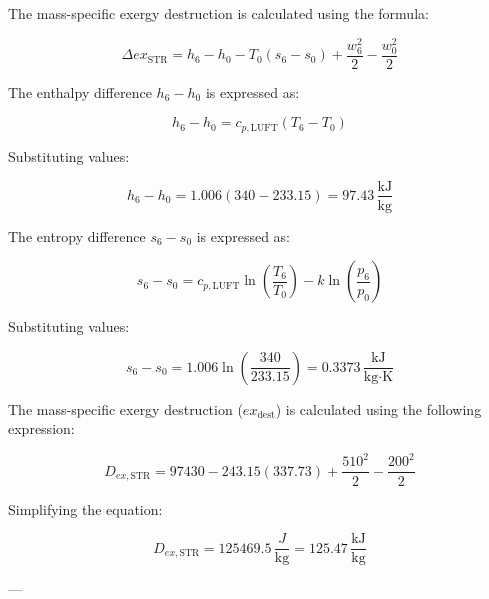 The mass-specific exergy destruction is calculated using the formula:  

\[
\Delta ex_{\text{STR}} = h_6 - h_0 - T_0 (s_6 - s_0) + \frac{w_6^2}{2} - \frac{w_0^2}{2}
\]

The enthalpy difference \( h_6 - h_0 \) is expressed as:  

\[
h_6 - h_0 = c_{p,\text{LUFT}} (T_6 - T_0)
\]

Substituting values:  

\[
h_6 - h_0 = 1.006 (340 - 233.15) = 97.43 \, \frac{\text{kJ}}{\text{kg}}
\]

The entropy difference \( s_6 - s_0 \) is expressed as:  

\[
s_6 - s_0 = c_{p,\text{LUFT}} \ln \left( \frac{T_6}{T_0} \right) - k \ln \left( \frac{p_6}{p_0} \right)
\]

Substituting values:  

\[
s_6 - s_0 = 1.006 \ln \left( \frac{340}{233.15} \right) = 0.3373 \, \frac{\text{kJ}}{\text{kg·K}}
\]

The mass-specific exergy destruction (\( ex_{\text{dest}} \)) is calculated using the following expression:  

\[
D_{ex,\text{STR}} = 97430 - 243.15 (337.73) + \frac{510^2}{2} - \frac{200^2}{2}
\]

Simplifying the equation:  

\[
D_{ex,\text{STR}} = 125469.5 \, \frac{J}{\text{kg}} = 125.47 \, \frac{\text{kJ}}{\text{kg}}
\]

---